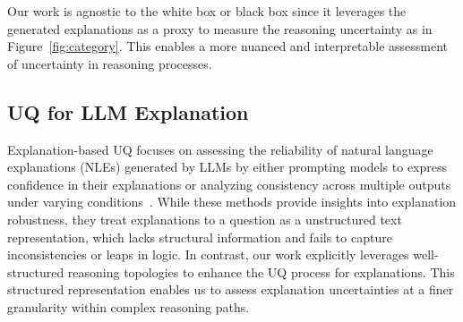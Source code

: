 Our work is agnostic to the white box or black box since it leverages the generated explanations as a proxy to measure the reasoning uncertainty as in Figure~\ref{fig:category}. This enables a more nuanced and interpretable assessment of uncertainty in reasoning processes.


\subsection{UQ for LLM Explanation} 
Explanation-based UQ focuses on assessing the reliability of natural language explanations (NLEs) generated by LLMs by either prompting models to express confidence in their explanations or analyzing consistency across multiple outputs under varying conditions~\cite{tanneru2024quantifying, yadkori2024believe}. While these methods provide insights into explanation robustness, they treat explanations to a question as a unstructured text representation, which lacks structural information and fails to capture inconsistencies or leaps in logic. In contrast, our work explicitly leverages well-structured reasoning topologies to enhance the UQ process for explanations. This structured representation enables us to assess explanation uncertainties at a finer granularity within complex reasoning paths.

